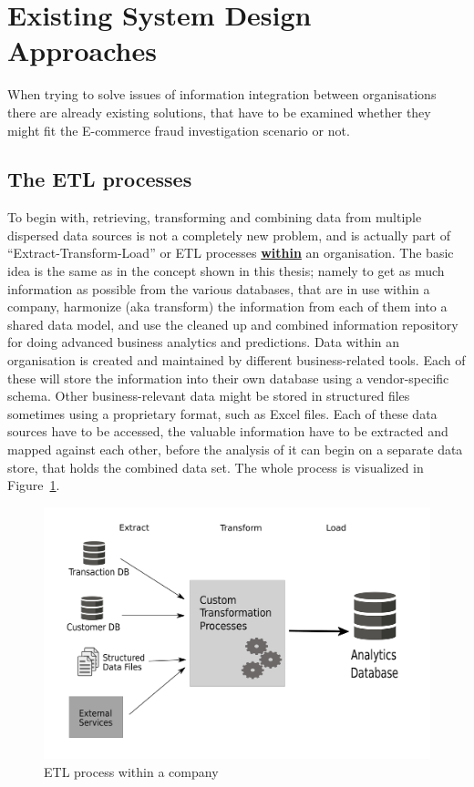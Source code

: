
\section{Existing System Design Approaches}
\label{sec:system_approaches}

When trying to solve issues of information integration between organisations there are already existing solutions, that have to be examined whether they might fit the \gls{E-commerce} fraud investigation scenario or not.

\subsection{The \gls{ETL} processes}
\label{subsec:etl_process}

To begin with, retrieving, transforming and combining data from multiple dispersed data sources is not a completely new problem, and is actually part of ``Extract-Transform-Load'' or \gls{ETL} processes \textbf{\underline{within}} an organisation. The basic idea is the same as in the concept shown in this thesis; namely to get as much information as possible from the various databases, that are in use within a company, harmonize (aka transform) the information from each of them into a shared data model, and use the cleaned up and combined information repository for doing advanced business analytics and predictions. Data within an organisation is created and maintained by different business-related tools. Each of these will store the information into their own database using a vendor-specific schema. Other business-relevant data might be stored in structured files sometimes using a proprietary format, such as Excel files. Each of these data sources have to be accessed, the valuable information have to be extracted and mapped against each other, before the analysis of it can begin on a separate data store, that holds the combined data set. The whole process is visualized in Figure~\ref{fig:images_etl_process}. \\

\begin{figure}[!ht]
  \centering
  \includegraphics[width=0.9\columnwidth]{images/etl_process.pdf}
  \caption{\gls{ETL} process within a company \citep[pg. 165]{wood2014linked}}
\label{fig:images_etl_process}
\end{figure}

